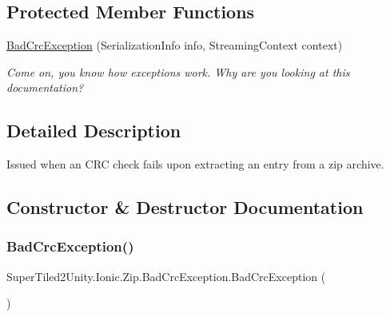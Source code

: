 \subsection*{Protected Member Functions}
\begin{DoxyCompactItemize}
\item 
\mbox{\hyperlink{class_super_tiled2_unity_1_1_ionic_1_1_zip_1_1_bad_crc_exception_a7fe19e83551a2037dfc5b08928d6435e}{Bad\+Crc\+Exception}} (Serialization\+Info info, Streaming\+Context context)
\begin{DoxyCompactList}\small\item\em Come on, you know how exceptions work. Why are you looking at this documentation? \end{DoxyCompactList}\end{DoxyCompactItemize}


\subsection{Detailed Description}
Issued when an C\+RC check fails upon extracting an entry from a zip archive. 



\subsection{Constructor \& Destructor Documentation}
\mbox{\label{class_super_tiled2_unity_1_1_ionic_1_1_zip_1_1_bad_crc_exception_afe83ef14b0d80d345bd244771860f37d}} 
\subsubsection{\texorpdfstring{Bad\+Crc\+Exception()}{BadCrcException()}\hspace{0.1cm}{\footnotesize\ttfamily [1/3]}}
{\footnotesize\ttfamily Super\+Tiled2\+Unity.\+Ionic.\+Zip.\+Bad\+Crc\+Exception.\+Bad\+Crc\+Exception (\begin{DoxyParamCaption}{ }\end{DoxyParamCaption})}



